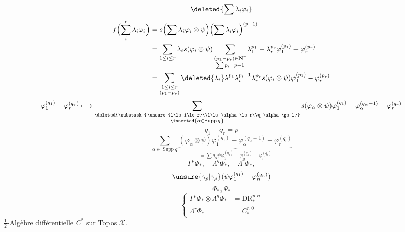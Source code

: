 \[
\deleted{\sum\lambda_i\varphi_i}
\]
\[
\begin{aligned}
f\Bigl(\sum_i^r\lambda_i\varphi_i\Bigr)
&=s\Bigl(\sum\lambda_i\varphi_i\otimes\psi\Bigr)
\Bigl(\sum\lambda_i\varphi_i\Bigr)^{(p-1)}\\
&=\sum_{1\le i\le r}\lambda_i s(\varphi_i\otimes\psi)
\sum_{\substack{(p_1-p_r)\in\mathbf N^r\\\sum p_i=p-1}}
\lambda_1^{p_1}-\lambda_r^{p_r}\varphi_1^{(p_1)}-\varphi_r^{(p_r)}\\
&=\sum_{\substack{1\le i\le r\\(p_1-p_r)}}
\deleted{\lambda_i}\lambda_1^{p_1}\lambda_i^{p_i+1}\lambda_r^{p_r}
s(\varphi_i\otimes\psi)\varphi_1^{(p_1)}-\varphi_r^{(p_r)}
\end{aligned}
\]
\[
\varphi_1^{(q_1)}-\varphi_r^{(q_r)}\longmapsto
\sum_{\substack{\deleted{\substack{\unsure{1\le i\le r}\\1\le\alpha\le r\\q_\alpha\ge1}}\\\inserted{\alpha\in\operatorname{Supp}q}}}
s(\varphi_\alpha\otimes\psi)\varphi_1^{(q_1)}-
\varphi_\alpha^{(q_\alpha-1)}-\varphi_r^{(q_r)}
\]
\[
q_1-q_r=p
\]
\diagram{\begin{tikzcd}[row sep=large]
\Gamma^2\Phi_*\otimes\Psi_*\arrow[d,bend left=35,"?"]\\
\Gamma^2\Phi_*\otimes\Phi_*\arrow[u]\\
\Gamma^2\Phi_*\arrow[u]\\
0\arrow[u]
\end{tikzcd}}
\[
\sum_{\alpha\in\operatorname{Supp}q}
\underbrace{(\varphi_\alpha\otimes\psi)
\varphi_1^{(q_1)}-\varphi_\alpha^{(q_\alpha-1)}-\varphi_r^{(q_r)}}_{
\displaystyle=\sum q_\alpha\psi\varphi_1^{(q_1)}-\varphi_\alpha^{(q_\alpha)}-\varphi_r^{(q_r)}}
\]
\[
\Gamma^p\Phi_*,\quad\Lambda^q\Psi_*,\quad\Lambda^r\Phi_*,
\]
\[
\unsure{\gamma_p|\gamma_\rho}(\psi\varphi_1^{(q_1)}-\varphi_n^{(q_n)})
\]
\[
\Phi_*,\Psi_*
\]
\[
\left\{\begin{aligned}
\Gamma^p\Phi_*\otimes\Lambda^q\Psi_*&=\mathrm{DR}_*^{p,q}\\
\Lambda^r\Phi_*&=C_*^{r,0}
\end{aligned}\right.
\]
$\frac12$-Algèbre différentielle $C^*$ sur Topos $\mathcal X$.

